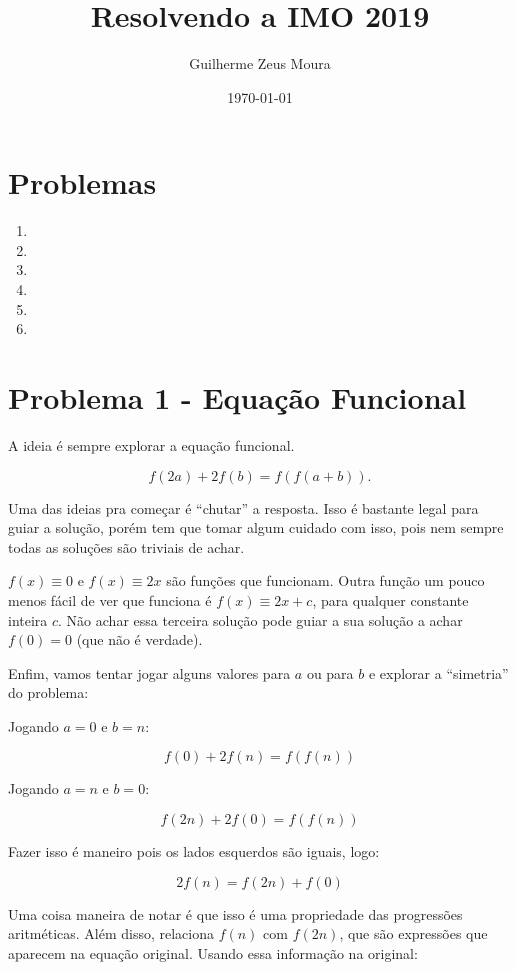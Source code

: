 \documentclass[10pt,a4paper]{article}
\title{Resolvendo a IMO 2019}
\date{\today}
\author{Guilherme Zeus Moura}
\begin{document}
	\maketitle
	\section*{Problemas}
	\begin{enumerate}
		\item {}
		\item {}
		\item {}
		\item {}
		\item {}
		\item {}
	\end{enumerate}

	\section*{Problema 1 - Equação Funcional}

	A ideia é sempre explorar a equação funcional.

	$$f(2a) + 2f(b) = f(f(a + b)).$$

	Uma das ideias pra começar é ``chutar'' a resposta. Isso é bastante legal para guiar a solução, porém tem que tomar algum cuidado com isso, pois nem sempre todas as soluções são triviais de achar.

	$f(x) \equiv 0$ e $f(x) \equiv 2x$ são funções que funcionam. Outra função um pouco menos fácil de ver que funciona é $f(x) \equiv 2x + c$, para qualquer constante inteira $c$.
	Não achar essa terceira solução pode guiar a sua solução a achar $f(0) = 0$ (que não é verdade).

	Enfim, vamos tentar jogar alguns valores para $a$ ou para $b$ e explorar a ``simetria'' do problema:

	Jogando $a = 0$ e $b = n$:

	$$f(0) + 2f(n) = f(f(n))$$

	Jogando $a = n$ e $b = 0$:

	$$f(2n) + 2f(0) = f(f(n))$$

	Fazer isso é maneiro pois os lados esquerdos são iguais, logo:

	$$2f(n) = f(2n) + f(0)$$

	Uma coisa maneira de notar é que isso é uma propriedade das progressões aritméticas. Além disso, relaciona $f(n)$ com $f(2n)$, que são expressões que aparecem na equação original. Usando essa informação na original:
\end{document}
